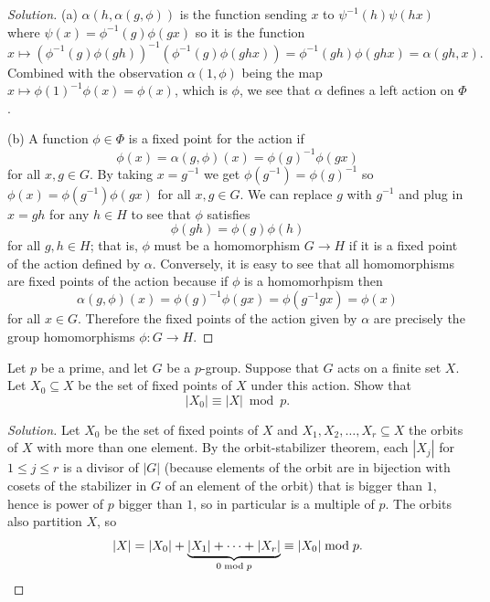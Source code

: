 \documentclass[10pt]{article}
\providecommand{\quiv}{\equiv}
\providecommand{\inv}{^{-1}}
\newenvironment{soln}{\begin{proof}[Solution]}{\end{proof}}
\providecommand{\abs}[1]{\left|#1\right|}
\begin{document}
\begin{soln}
    (a) $\alpha(h, \alpha(g,\phi))$ is the function sending
    $x$ to $\psi\inv(h)\psi(hx)$
    where $\psi(x) = \phi\inv(g)\phi(gx)$ so it is the function
    \begin{equation*}
        x\mapsto (\phi\inv(g)\phi(gh))\inv(\phi\inv(g)\phi(ghx)) =
	\phi\inv(gh)\phi(ghx) = \alpha(gh,x).
    \end{equation*}
    Combined with the observation $\alpha(1,\phi)$ being the map
    $x\mapsto\phi(1)\inv\phi(x) = \phi(x)$, which is $\phi$,
    we see that $\alpha$ defines a left action on $\Phi$.

    (b) A function $\phi\in\Phi$ is a fixed point for the action if
    \begin{equation*}
        \phi(x) = \alpha(g,\phi)(x) = \phi(g)\inv\phi(gx)
    \end{equation*}
    for all $x,g\in G$. By taking $x = g\inv$ we get $\phi(g\inv) = \phi(g)\inv$
    so $\phi(x) = \phi(g\inv)\phi(gx)$ for all $x,g\in G$.
    We can replace $g$ with $g\inv$ and plug in $x = gh$ for any $h\in H$
    to see that $\phi$ satisfies
    \begin{equation*}
        \phi(gh) = \phi(g)\phi(h)
    \end{equation*}
    for all $g,h\in H$; that is, $\phi$ must be a homomorphism $G\to H$
    if it is a fixed point of the action defined by $\alpha$.
    Conversely, it is easy to see that all homomorphisms are fixed points
    of the action because if $\phi$ is a homomorhpism then
    \begin{equation*}
        \alpha(g,\phi)(x) = \phi(g)\inv\phi(gx) = \phi(g\inv gx) = \phi(x)
    \end{equation*}
    for all $x\in G$. Therefore the fixed points of the action given by $\alpha$
    are precisely the group homomorphisms $\phi\colon G\to H$.
\end{soln}

\begin{problem}
    Let $p$ be a prime, and let $G$ be a $p$-group.
    Suppose that $G$ acts on a finite set $X$. Let $X_0\subseteq X$
    be the set of fixed points of $X$ under this action. Show that
    \begin{equation*}
	\abs{X_0}\quiv\abs X\bmod p.
    \end{equation*}
\end{problem}

\begin{soln}
    Let $X_0$ be the set of fixed points of $X$
    and $X_1,X_2,\dots,X_r\subseteq X$ the orbits of $X$
    with more than one element. By the orbit-stabilizer theorem,
    each $\abs{X_j}$ for $1\le j\le r$ is a divisor of $\abs G$
    (because elements of the orbit are in bijection with cosets of
    the stabilizer in $G$ of an element of the orbit)
    that is bigger than $1$, hence is power of $p$ bigger than $1$,
    so in particular is a multiple of $p$.
    The orbits also partition $X$, so
    \begin{equation*}
	\abs X = \abs{X_0} + \underbrace{\abs{X_1} + \cdots + \abs{X_r}}_{0\bmod p}
	\quiv \abs{X_0}\bmod p.\qedhere
    \end{equation*}
\end{soln}
\end{document}
